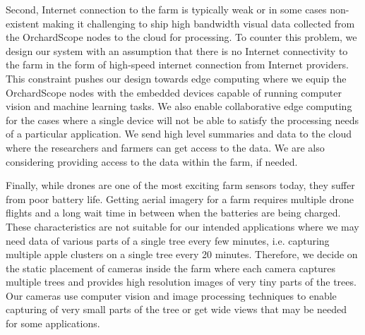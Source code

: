 Second,  Internet  connection  to  the  farm  is  typically weak or in some cases non-existent making it challenging to ship high bandwidth visual data collected from the OrchardScope nodes to the cloud for processing. 
To counter this problem, we design our system with an assumption that there is no Internet connectivity to the farm in the form of high-speed internet connection from Internet providers. This constraint pushes our design towards edge computing where we equip the OrchardScope nodes with the embedded devices capable of running computer vision and machine learning tasks. We also enable collaborative edge computing for the cases where a single device will not be able to satisfy the processing needs of a particular application. We send high level summaries and data to the cloud where the researchers and farmers can get access to the data. We are also considering providing access to the data within the farm, if needed. 

Finally, while drones are one of the most exciting farm sensors today, they suffer from poor battery life. Getting aerial imagery for a farm requires multiple drone flights and a long wait time in between when the batteries are being charged. These characteristics are not suitable for our intended applications where we may need data of various parts of a single tree every few minutes, i.e. capturing multiple apple clusters on a single tree every 20 minutes. Therefore, we decide on the static placement of cameras inside the farm where each camera captures multiple trees and provides high resolution images of very tiny parts of the trees. Our cameras use computer vision and image processing techniques to enable capturing of very small parts of the tree or get wide views that may be needed for some applications. 


